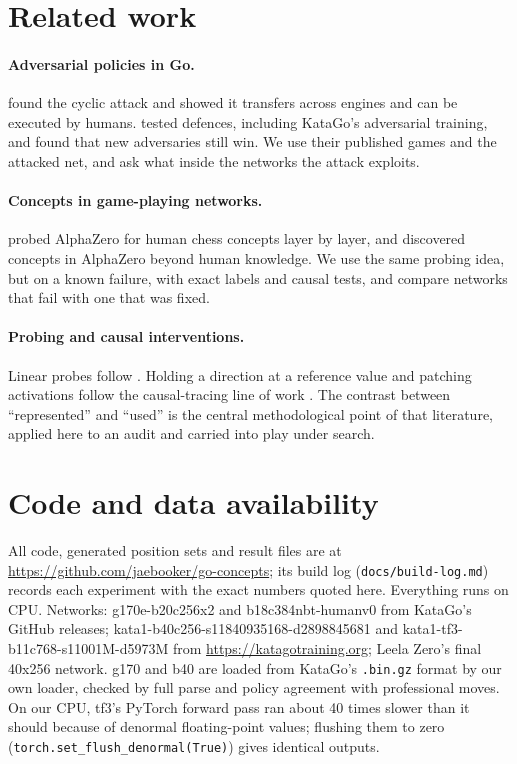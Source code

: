 \documentclass[11pt]{article}
\begin{document}
\section{Related work}
\label{sec:related}

\paragraph{Adversarial policies in Go.} \citet{wang2023adversarial} found the cyclic attack and showed it transfers across engines and can be executed by humans. \citet{tseng2025robust} tested defences, including KataGo's adversarial training, and found that new adversaries still win. We use their published games and the attacked net, and ask what inside the networks the attack exploits.

\paragraph{Concepts in game-playing networks.} \citet{mcgrath2022acquisition} probed AlphaZero for human chess concepts layer by layer, and \citet{schut2025bridging} discovered concepts in AlphaZero beyond human knowledge. We use the same probing idea, but on a known failure, with exact labels and causal tests, and compare networks that fail with one that was fixed.

\paragraph{Probing and causal interventions.} Linear probes follow \citet{alain2016probes}. Holding a direction at a reference value and patching activations follow the causal-tracing line of work \citep{meng2022locating}. The contrast between ``represented'' and ``used'' is the central methodological point of that literature, applied here to an audit and carried into play under search.

\section*{Code and data availability}

All code, generated position sets and result files are at \url{https://github.com/jaebooker/go-concepts}; its build log (\texttt{docs/build-log.md}) records each experiment with the exact numbers quoted here. Everything runs on CPU. Networks: g170e-b20c256x2 and b18c384nbt-humanv0 from KataGo's GitHub releases; kata1-b40c256-s11840935168-d2898845681 and kata1-tf3-b11c768-s11001M-d5973M from \url{https://katagotraining.org}; Leela Zero's final 40x256 network. g170 and b40 are loaded from KataGo's \texttt{.bin.gz} format by our own loader, checked by full parse and policy agreement with professional moves. On our CPU, tf3's PyTorch forward pass ran about 40 times slower than it should because of denormal floating-point values; flushing them to zero (\texttt{torch.set\_flush\_denormal(True)}) gives identical outputs.
\end{document}
